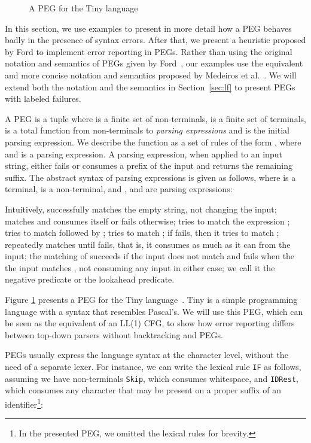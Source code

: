 \documentclass[3p,12pt,singlecolumn]{elsarticle}
\begin{document}
\begin{figure}[t]

\caption{A PEG for the Tiny language}
\label{fig:tiny}
\end{figure}

In this section, we use examples to present in more detail how a
PEG behaves badly in the presence of syntax errors.
After that, we present a heuristic proposed by Ford
\cite{ford2002packrat} to implement error reporting in PEGs.
Rather than using the original notation and semantics of PEGs 
given by Ford~\cite{ford2004peg}, our examples use the
equivalent and more concise notation and semantics proposed
by Medeiros et al.~\cite{medeiros2011re2peg,medeiros2012left,mascarenhas2014}.
We will extend both the notation and the semantics in Section~\ref{sec:lf}
to present PEGs with labeled failures.

A PEG  is a tuple  where  is a finite set of
non-terminals,  is a finite set of terminals,  is a total
function from non-terminals to \emph{parsing expressions} and 
is the initial parsing expression.
We describe the function  as a set of rules of the form
, where  and  is a parsing
expression.
A parsing expression, when applied to an input string, either
fails or consumes a prefix of the input and returns the
remaining suffix. The abstract syntax of parsing expressions is
given as follows, where  is a terminal,  is a non-terminal,
and ,  and  are parsing expressions:


Intuitively,
 successfully matches the empty string, not changing
the input;
 matches and consumes itself or fails otherwise;
 tries to match the expression ;
 tries to match  followed by ;
 tries to match ;
if  fails, then it tries to match ;
 repeatedly matches  until  fails, that is, it
consumes as much as it can from the input;
the matching of  succeeds if the input does not match 
and fails when the the input matches , not consuming any input in either case;
we call it the negative predicate or the lookahead predicate.

Figure \ref{fig:tiny} presents a PEG for the Tiny language~\cite{louden1997ccp}.
Tiny is a simple programming language with a syntax that resembles
Pascal's. 
We will use this PEG, which can be seen as the equivalent of an LL(1) CFG,
to show how error reporting differs between top-down parsers without backtracking
and PEGs.

PEGs usually express the language syntax at the character level,
without the need of a separate lexer.
For instance, we can write the lexical rule \texttt{IF} as follows,
assuming we have non-terminals {\tt Skip}, which consumes whitespace,
and {\tt IDRest}, which consumes any character that may
be present on a proper suffix of an identifier\footnote{In the presented PEG, we omitted the lexical rules for brevity.}:
\end{document}

